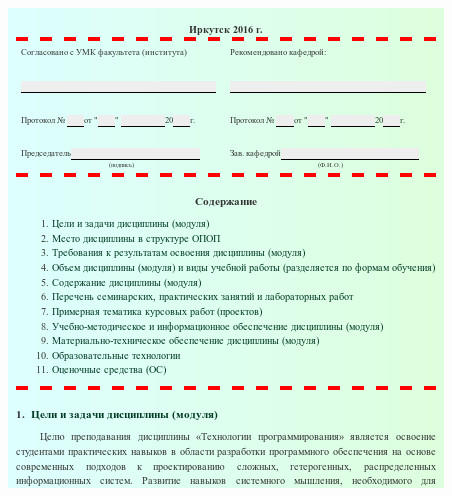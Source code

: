 \documentclass[10pt]{beamer}
\begin{document}
\begin{frame}
\begin{adjustwidth}{-2.5em}{-2.5em}
\begin{center}
\begin{columns}
\begin{column}{0.5\linewidth}
          \includegraphics[width=1\linewidth]{work-program-agreement.jpg}
        \end{column}
    \end{columns}
    \end{center}
  \end{adjustwidth}
\end{frame}
\end{document}
